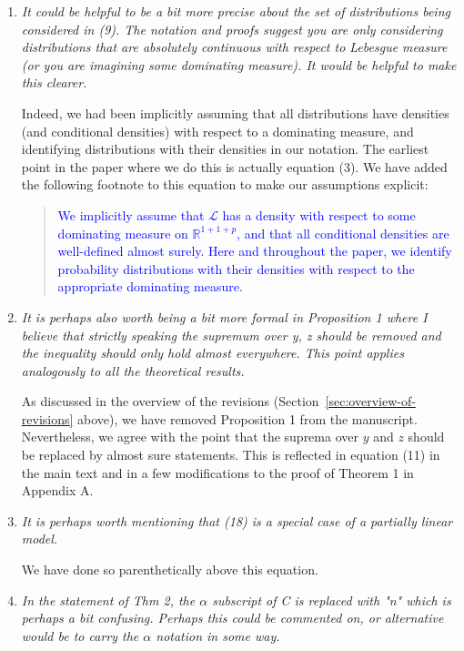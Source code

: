 \documentclass[12pt]{article}
\begin{document}
\begin{enumerate}
	\item \textsl{It could be helpful to be a bit more precise about the set of distributions being considered in (9). The notation and proofs suggest you are only considering distributions that are absolutely continuous with respect to Lebesgue measure (or you are imagining some dominating measure). It would be helpful to make this clearer.}
	
	Indeed, we had been implicitly assuming that all distributions have densities (and conditional densities) with respect to a dominating measure, and identifying distributions with their densities in our notation. The earliest point in the paper where we do this is actually equation (3). We have added the following footnote to this equation to make our assumptions explicit:
	
	\begin{quote}
	\textcolor{blue}{We implicitly assume that $\mathcal L$ has a density with respect to some dominating measure on $\mathbb R^{1+1+p}$, and that all conditional densities are well-defined almost surely. Here and throughout the paper, we identify probability distributions with their densities with respect to the appropriate dominating measure.}
	\end{quote}

	\item \textsl{It is perhaps also worth being a bit more formal in Proposition 1 where I believe that strictly speaking the supremum over y, z should be removed and the inequality should only hold almost everywhere. This point applies analogously to all the theoretical results.}
	
	As discussed in the overview of the revisions (Section~\ref{sec:overview-of-revisions} above), we have removed Proposition 1 from the manuscript. Nevertheless, we agree with the point that the suprema over $y$ and $z$ should be replaced by almost sure statements. This is reflected in equation (11) in the main text and in a few modifications to the proof of Theorem 1 in Appendix A.

	\item \textsl{It is perhaps worth mentioning that (18) is a special case of a partially linear model.}
	
	We have done so parenthetically above this equation.
	
	\item \textsl{In the statement of Thm 2, the $\alpha$ subscript of C is replaced with "n" which is perhaps a bit confusing. Perhaps this could be commented on, or alternative would be to carry the $\alpha$ notation in some way.}


\end{enumerate}
\end{document}
